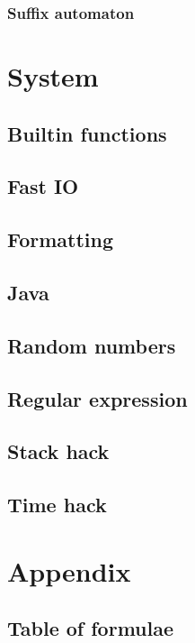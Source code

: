 \documentclass[titlepage,a4paper,10pt]{article}
\begin{document}
\begin{multicols}{2}
\begin{spacing}{0.8}
{				\subsubsection{Suffix automaton}
					
		\section{System}
			\subsection{Builtin functions}
				
			\subsection{Fast IO}
				
			\subsection{Formatting}
				
			\subsection{Java}
				
			\subsection{Random numbers}
				
			\subsection{Regular expression}
				
			\subsection{Stack hack}
				
			\subsection{Time hack}
				
		\section{Appendix}
			\subsection{Table of formulae}
				
}
\end{spacing}
\end{multicols}
\end{document}
